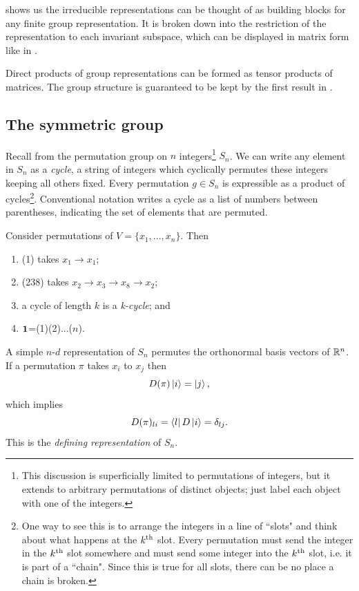  shows us the irreducible
representations can be thought of as building blocks for any
finite group representation. It is broken down into the restriction
of the representation to each invariant subspace, which 
can be displayed in matrix form like in .

Direct products of group representations can be formed as
tensor products of matrices. The group structure is guaranteed
to be kept by the first result in .


\subsection{The symmetric group}

Recall from  the 
permutation group on
$n$ integers\footnote{This discussion is superficially limited
to permutations of integers, but it extends to arbitrary permutations
of distinct objects; just label each object with one of the integers.} 
$S_n$. We can write any element in $S_n$ as a {\it cycle}, 
a string of integers which cyclically permutes these
integers keeping all others fixed.
Every permutation $g\in S_n$ is expressible as a product
of cycles\footnote{One way to see this is to arrange the integers in a line 
of ``slots" and think about what happens at the $k{}^{\rm th}$ slot. Every
permutation must send the integer in the $k{}^{\rm th}$ slot somewhere and must send
some integer into the $k{}^{\rm th}$ slot, i.e. it is part of a ``chain". Since
this is true for all slots, there can be no place a chain is broken.}.
Conventional notation writes a cycle as a list of numbers between
parentheses, indicating the set of elements that are permuted.
\begin{example*}{}{}
  Consider permutations of $V=\{x_1,...,x_n\}$. Then
  \begin{enumerate}
    \item (1) takes $x_1\to x_1$;
    \item (238) takes $x_2\to x_3\to x_8\to x_2$;
    \item a cycle of length $k$ is a {\it k-cycle}; and
    \item ${\mathbf 1}$=(1)(2)...($n$).
  \end{enumerate}
\end{example*}


A simple $n$-$d$ representation of $S_n$ permutes the orthonormal
basis vectors of $\mathbb{R}^n$. If a permutation $\pi$ takes $x_i$
to $x_j$ then
\begin{equation}
  D(\pi)\ket{i}=\ket{j},
\end{equation}
which implies
\begin{equation}
  D(\pi)_{li}=\bra{l}D\ket{i}=\delta_{lj}.
\end{equation}
This is the {\it defining representation}
of $S_n$.

